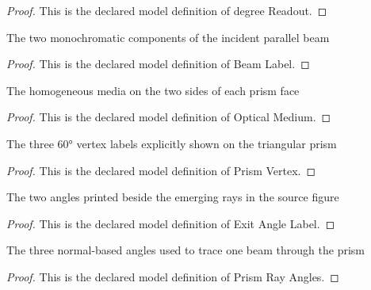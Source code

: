 \begin{proof}
  This is the declared model definition of degree Readout.
\end{proof}
\begin{definition}
  \label{def:physics:phyx-mini-0150:phyxminiproblems-problemphyxmini0150-beamlabel}
  The two monochromatic components of the incident parallel beam
\end{definition}
\begin{proof}
  This is the declared model definition of Beam Label.
\end{proof}
\begin{definition}
  \label{def:physics:phyx-mini-0150:phyxminiproblems-problemphyxmini0150-opticalmedium}
  The homogeneous media on the two sides of each prism face
\end{definition}
\begin{proof}
  This is the declared model definition of Optical Medium.
\end{proof}
\begin{definition}
  \label{def:physics:phyx-mini-0150:phyxminiproblems-problemphyxmini0150-prismvertex}
  The three 60° vertex labels explicitly shown on the triangular prism
\end{definition}
\begin{proof}
  This is the declared model definition of Prism Vertex.
\end{proof}
\begin{definition}
  \label{def:physics:phyx-mini-0150:phyxminiproblems-problemphyxmini0150-exitanglelabel}
  The two angles printed beside the emerging rays in the source figure
\end{definition}
\begin{proof}
  This is the declared model definition of Exit Angle Label.
\end{proof}
\begin{definition}
  \label{def:physics:phyx-mini-0150:phyxminiproblems-problemphyxmini0150-prismrayangles}
  The three normal-based angles used to trace one beam through the prism
\end{definition}
\begin{proof}
  This is the declared model definition of Prism Ray Angles.
\end{proof}
